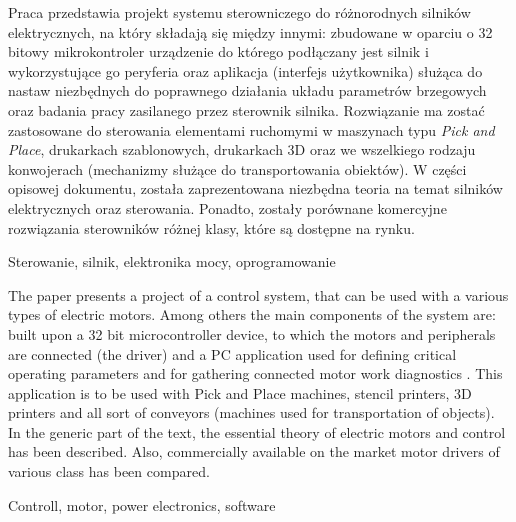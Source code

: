 \thispagestyle{empty}

Praca przedstawia projekt systemu sterowniczego do różnorodnych silników elektrycznych, na który składają się między innymi: zbudowane w oparciu o 32 bitowy mikrokontroler urządzenie do którego podłączany jest silnik i wykorzystujące go peryferia oraz aplikacja (interfejs użytkownika) służąca do nastaw niezbędnych do poprawnego działania układu parametrów brzegowych oraz badania pracy zasilanego przez sterownik silnika. Rozwiązanie ma zostać zastosowane do sterowania elementami ruchomymi w maszynach typu {\it Pick and Place}, drukarkach szablonowych, drukarkach 3D oraz we wszelkiego rodzaju konwojerach (mechanizmy służące do transportowania obiektów). W części opisowej dokumentu, została zaprezentowana niezbędna teoria na temat silników elektrycznych oraz sterowania. Ponadto, zostały porównane komercyjne rozwiązania sterowników różnej klasy, które są dostępne na rynku.

Sterowanie, silnik, elektronika mocy, oprogramowanie

The paper presents a project of a control system, that can be used with a various types of electric motors. Among others the main components of the system are: built upon a 32 bit microcontroller device, to which the motors and peripherals are connected (the driver) and a PC application used for defining critical operating parameters and for gathering connected motor work diagnostics . This application is to be used with Pick and Place machines, stencil printers, 3D printers and all sort of conveyors (machines used for transportation of objects). In the generic part of the text, the essential theory of electric motors and control has been described. Also, commercially available on the market  motor drivers of various class has been compared.

Controll, motor, power electronics, software


\clearpage
